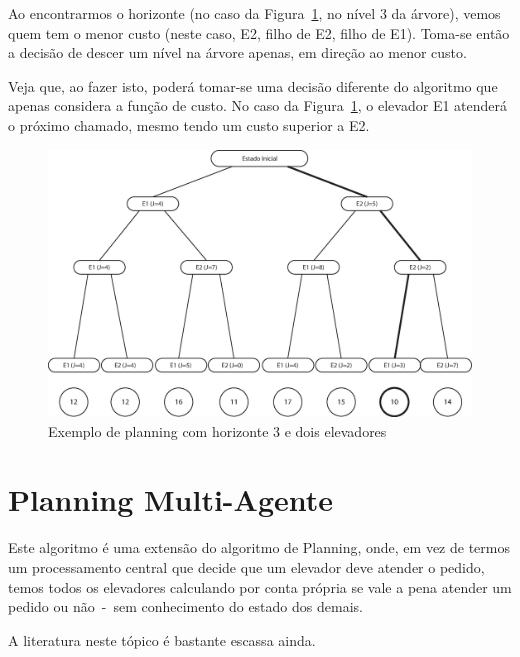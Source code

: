 Ao encontrarmos o horizonte (no caso da Figura~\ref{fig:planning}, no nível 3 da
árvore), vemos quem tem o menor custo (neste caso, E2, filho de E2, filho de
E1). Toma-se então a decisão de descer um nível na árvore apenas, em direção ao
menor custo.

Veja que, ao fazer isto, poderá tomar-se uma decisão diferente do algoritmo que apenas
considera a função de custo. No caso da Figura~\ref{fig:planning}, o elevador E1
atenderá o próximo chamado, mesmo tendo um custo superior a E2.

\begin{figure}[htb!]
  \centering
  \includegraphics[scale=0.6]{img/planning.eps}
  \caption{Exemplo de planning com horizonte 3 e dois elevadores}
\label{fig:planning}
\end{figure}

\section{Planning Multi-Agente}

Este algoritmo é uma extensão do algoritmo de Planning, onde, em vez de termos
um processamento central que decide que um elevador deve atender o pedido, temos
todos os elevadores calculando por conta própria se vale a pena atender um
pedido ou não~-~sem conhecimento do estado dos demais.

A literatura neste tópico é bastante escassa ainda.